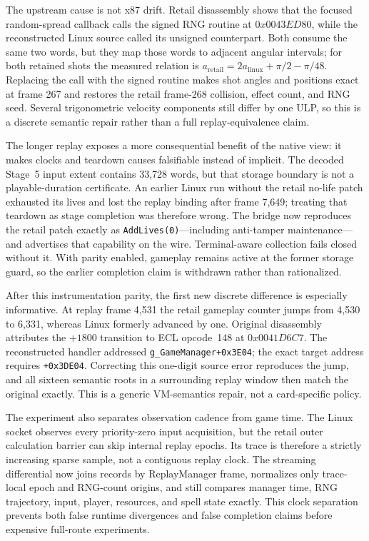 \documentclass[10pt]{article}
\newcommand{\code}[1]{\texttt{#1}}
\begin{document}
The upstream cause is not x87 drift.  Retail disassembly shows that the
focused random-spread callback calls the signed RNG routine at
$0x0043ED80$, while the reconstructed Linux source called its unsigned
counterpart.  Both consume the same two words, but they map those words to
adjacent angular intervals; for both retained shots the measured relation is
$a_{\mathrm{retail}}=2a_{\mathrm{linux}}+\pi/2-\pi/48$.  Replacing the call
with the signed routine makes shot angles and positions exact at frame 267 and
restores the retail frame-268 collision, effect count, and RNG seed.  Several
trigonometric velocity components still differ by one ULP, so this is a
discrete semantic repair rather than a full replay-equivalence claim.

The longer replay exposes a more consequential benefit of the native view:
it makes clocks and teardown causes falsifiable instead of implicit.  The
decoded Stage~5 input extent contains 33,728 words, but that storage boundary
is not a playable-duration certificate.  An earlier Linux run without the
retail no-life patch exhausted its lives and lost the replay binding after
frame 7,649; treating that teardown as stage completion was therefore wrong.
The bridge now reproduces the retail patch exactly as
\code{AddLives(0)}---including anti-tamper maintenance---and advertises that
capability on the wire.  Terminal-aware collection fails closed without it.
With parity enabled, gameplay remains active at the former storage guard, so
the earlier completion claim is withdrawn rather than rationalized.

After this instrumentation parity, the first new discrete difference is
especially informative.  At replay frame 4,531 the retail gameplay counter
jumps from 4,530 to 6,331, whereas Linux formerly advanced by one.  Original
disassembly attributes the $+1800$ transition to ECL opcode~148 at
$0x0041D6C7$.  The reconstructed handler addressed
\code{g\_GameManager+0x3E04}; the exact target address requires
\code{+0x3DE04}.  Correcting this one-digit source error reproduces the jump,
and all sixteen semantic roots in a surrounding replay window then match the
original exactly.  This is a generic VM-semantics repair, not a card-specific
policy.

The experiment also separates observation cadence from game time.  The Linux
socket observes every priority-zero input acquisition, but the retail outer
calculation barrier can skip internal replay epochs.  Its trace is therefore
a strictly increasing sparse sample, not a contiguous replay clock.  The
streaming differential now joins records by ReplayManager frame, normalizes
only trace-local epoch and RNG-count origins, and still compares manager time,
RNG trajectory, input, player, resources, and spell state exactly.  This
clock separation prevents both false runtime divergences and false completion
claims before expensive full-route experiments.
\end{document}
